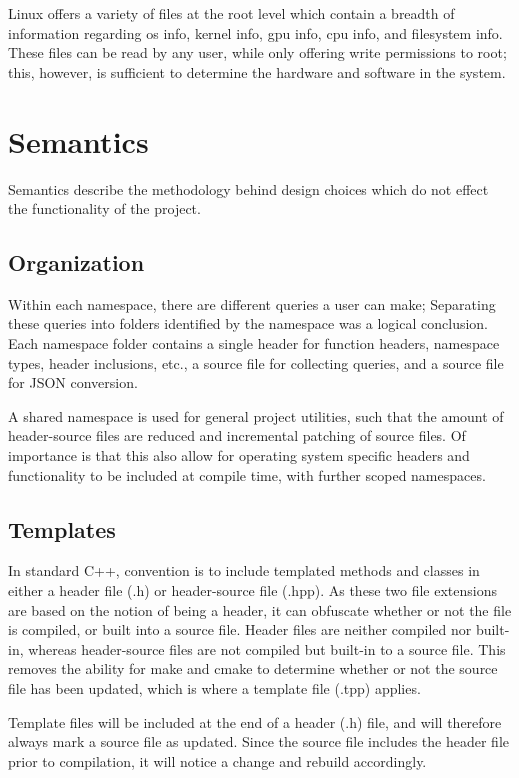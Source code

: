 \documentclass[conference]{IEEEtran}
\begin{document}
Linux offers a variety of files at the root level which contain a breadth of information regarding os info,
kernel info, gpu info, cpu info, and filesystem info. These files can be read by any user, while only offering
write permissions to root; this, however, is sufficient to determine the hardware and software in the system.

\section{Semantics}
Semantics describe the methodology behind design choices which do not effect the functionality of the project.

\subsection{Organization}
Within each namespace, there are different queries a user can make;
Separating these queries into folders identified by the namespace was a logical conclusion.
Each namespace folder contains a single header for function headers, namespace types, header inclusions, etc.,
a source file for collecting queries, and a source file for JSON conversion.

A shared namespace is used for general project utilities, such that the amount of header-source files are reduced and
incremental patching of source files. Of importance is that this also allow for operating system specific
headers and functionality to be included at compile time, with further scoped namespaces.

\subsection{Templates}
In standard C++, convention is to include templated methods and classes in either a header file (.h) or header-source file (.hpp).
As these two file extensions are based on the notion of being a header, it can obfuscate whether or not the file is compiled, or built into a source file.
Header files are neither compiled nor built-in, whereas header-source files are not compiled but built-in to a source file.
This removes the ability for make and cmake to determine whether or not the source file has been updated, which is where a template file (.tpp) applies.

Template files will be included at the end of a header (.h) file, and will therefore always mark a source file as updated.
Since the source file includes the header file prior to compilation, it will notice a change and rebuild accordingly.
\end{document}

